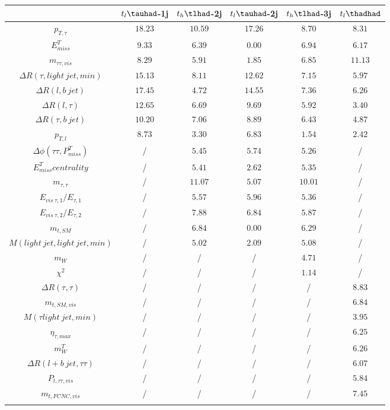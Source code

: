\centering
\begin{tabular}{cccccc} \toprule\toprule
 & $t_{l}\tauhad$-1j & $t_{h}\tlhad$-2j & $t_{l}\tauhad$-2j & $t_{h}\tlhad$-3j & $t_l\thadhad$\\\midrule
$p_{T,\tau }$ & $18.23$ & $10.59$ & $17.26$ & $8.70$ & $8.31$\\
$E^{T}_{miss}$ & $9.33$ & $6.39$ & $0.00$ & $6.94$ & $6.17$\\
$m_{\tau \tau ,vis}$ & $8.29$ & $5.91$ & $1.85$ & $6.85$ & $11.13$\\
$\Delta R(\tau ,light~jet,min)$ & $15.13$ & $8.11$ & $12.62$ & $7.15$ & $5.97$\\
$\Delta R(l,b~jet)$ & $17.45$ & $4.72$ & $14.55$ & $7.36$ & $6.26$\\
$\Delta R(l,\tau )$ & $12.65$ & $6.69$ & $9.69$ & $5.92$ & $3.40$\\
$\Delta R(\tau ,b~jet)$ & $10.20$ & $7.06$ & $8.89$ & $6.43$ & $4.87$\\
$p_{T,l}$ & $8.73$ & $3.30$ & $6.83$ & $1.54$ & $2.42$\\
$\Delta\phi(\tau \tau ,P^{T}_{miss})$ &  / & $5.45$ & $5.74$ & $5.26$ &  /\\
$E^{T}_{miss} centrality$ &  / & $5.41$ & $2.62$ & $5.35$ &  /\\
$m_{\tau ,\tau }$ &  / & $11.07$ & $5.07$ & $10.01$ &  /\\
$E_{vis~\tau ,1}/E_{\tau ,1}$ &  / & $5.57$ & $5.96$ & $5.36$ &  /\\
$E_{vis~\tau ,2}/E_{\tau ,2}$ &  / & $7.88$ & $6.84$ & $5.87$ &  /\\
$m_{t,SM}$ &  / & $6.84$ & $0.00$ & $6.29$ &  /\\
$M(light~jet,light~jet,min)$ &  / & $5.02$ & $2.09$ & $5.08$ &  /\\
$m_{W}$ &  / &  / &  / & $4.71$ &  /\\
$\chi^{2}$ &  / &  / &  / & $1.14$ &  /\\
$\Delta R(\tau ,\tau )$ &  / &  / &  / &  / & $8.83$\\
$m_{t,SM,vis}$ &  / &  / &  / &  / & $6.84$\\
$M(\tau  light~jet,min)$ &  / &  / &  / &  / & $3.95$\\
$\eta_{\tau ,max}$ &  / &  / &  / &  / & $6.25$\\
$m^{T}_{W}$ &  / &  / &  / &  / & $6.26$\\
$\Delta R(l+b~jet,\tau \tau )$ &  / &  / &  / &  / & $6.07$\\
$P_{t,\tau \tau ,vis}$ &  / &  / &  / &  / & $5.84$\\
$m_{t,FCNC,vis}$ &  / &  / &  / &  / & $7.45$\\
\bottomrule\bottomrule\\
\end{tabular}
